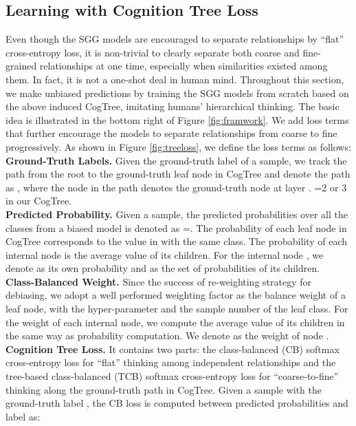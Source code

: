 \documentclass[letterpaper]{article} \usepackage{aaai21}  \usepackage{times}  \usepackage{helvet} \usepackage{courier}  \usepackage[hyphens]{url}  \usepackage{graphicx} \urlstyle{rm} \def\UrlFont{\rm}  \usepackage{natbib}  \usepackage{caption} \frenchspacing  \setlength{\pdfpagewidth}{8.5in}  \setlength{\pdfpageheight}{11in}  \usepackage{amsmath,amsthm}
\begin{document}
\subsection{Learning with Cognition Tree Loss}
\label{sec:TreeLoss}

Even though the SGG models are encouraged to separate relationships by ``flat'' cross-entropy loss, it is non-trivial to clearly separate  both coarse and fine-grained relationships at one time, especially when similarities existed among them. In fact, it is not a one-shot deal in human mind. Throughout this section, we make unbiased predictions by training the SGG models from scratch based on the above induced CogTree, imitating humans' hierarchical thinking. The basic idea is illustrated in the bottom right of Figure \ref{fig:framwork}. We add loss terms that further encourage the models to separate relationships from coarse to fine progressively. As shown in Figure \ref{fig:treeloss}, we define the loss terms  as follows:
\\
\textbf{Ground-Truth Labels.} Given the ground-truth label of a sample, we track the path from the root to the ground-truth leaf node in  CogTree and denote the path as , where the  node  in the path denotes the ground-truth node at layer . =2 or 3 in our CogTree.
\\
\textbf{Predicted Probability.} Given a sample, the predicted probabilities over all the classes  from a biased model is denoted as =. The probability of each leaf node in CogTree corresponds to the value in  with the same class. The probability of each internal node is the average value of its children. For the internal node , we denote  as its own probability and  as the set of probabilities of its children. 
\\
\textbf{Class-Balanced Weight.} Since the success of re-weighting strategy for debiasing, we adopt a well performed weighting factor   \cite{Cui2019Class} as the balance weight of a leaf node, with the hyper-parameter  and the sample number  of the leaf class. For the weight of each internal node, we compute the average value of its children in the same way as probability computation. We denote  as the weight of node .
\\
\textbf{Cognition Tree Loss.} It contains two parts: the  class-balanced (CB) softmax cross-entropy loss for ``flat'' thinking among independent relationships and the tree-based class-balanced (TCB) softmax cross-entropy loss for ``coarse-to-fine'' thinking along the ground-truth path in CogTree. Given a sample with the ground-truth label , the  CB loss is computed between predicted probabilities  and label  as: 
\end{document}
